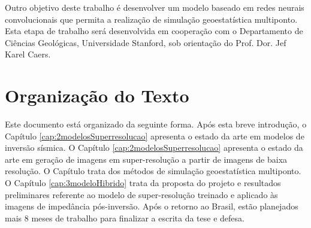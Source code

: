 Outro objetivo deste trabalho é desenvolver um modelo baseado em redes neurais convolucionais que permita a
realização de simulação geoestatística multiponto. Esta etapa de trabalho será desenvolvida
em cooperação com o Departamento de Ciências Geológicas, Universidade Stanford, sob
orientação do Prof. Dor. Jef Karel Caers.


\section{Organização do Texto}

Este documento está organizado da seguinte forma. Após esta breve introdução, o
Capítulo \ref{cap:2modelosSuperresolucao} apresenta o estado da arte em modelos de
inversão sísmica. O Capítulo \ref{cap:2modelosSuperresolucao} apresenta o estado da arte 
em geração de imagens em super-resolução a partir de imagens de baixa resolução.
O Capítulo trata dos métodos de simulação geoestatística multiponto. O
Capítulo \ref{cap:3modeloHibrido} trata da proposta do projeto e resultados
preliminares referente ao modelo de super-resolução treinado e aplicado às imagens
de impedância pós-inversão. Após o retorno ao Brasil, estão planejados mais 8 meses
de trabalho para finalizar a escrita da tese e defesa.

